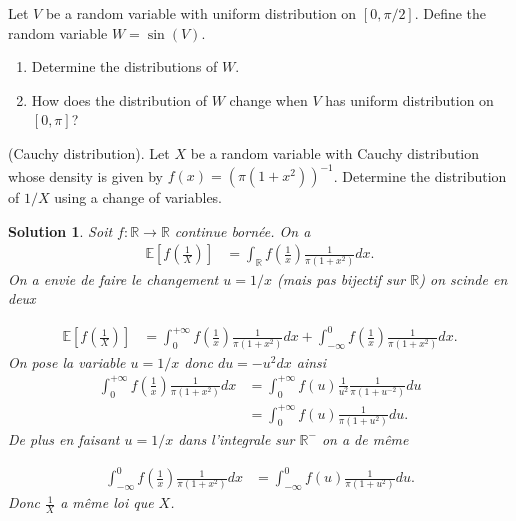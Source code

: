 \documentclass{article}
\newtheorem{solution}{Solution}
\begin{document}
\begin{Exercise} Let $V$ be a random variable with uniform distribution on $[0, \pi / 2]$. Define the random variable $W=\sin (V)$.
  \begin{enumerate}
    \item Determine the distributions of $W$.
    \item How does the distribution of $W$ change when $V$ has uniform distribution on
          $[0, \pi]$?
  \end{enumerate}
\end{Exercise}

\begin{Exercise} (Cauchy distribution). Let $X$ be a random variable with Cauchy distribution whose density is given by $f(x)={\left(\pi\left(1+x^{2}\right)\right)}^{-1}$. Determine the distribution of $1 / X$ using a change of variables.
\end{Exercise}

\begin{solution}
  Soit $f:\mathbb R\longrightarrow \mathbb R$ continue born\'ee. On a
  \begin{align*}
    \mathbb E[f(\frac1X)] & =\int_\mathbb R f(\frac1x) \frac{1}{\pi(1+x^2)} dx.
  \end{align*}
  On a envie de faire le changement $u=1/x$ (mais pas bijectif sur $\mathbb R$) on scinde en deux

  \begin{align*}
    \mathbb E[f(\frac1X)] & =\int_0^{+\infty} f(\frac1x) \frac{1}{\pi(1+x^2)} dx+ \int_{-\infty}^0 f(\frac1x) \frac{1}{\pi(1+x^2)} dx.
  \end{align*}
  On pose la variable $u=1/x$ donc $du=-u^2 dx$ ainsi
  \begin{align*}
    \int_0^{+\infty} f(\frac1x) \frac{1}{\pi(1+x^2)} dx & =\int_0^{+\infty} f(u)\frac{1}{u^2}  \frac{1}{\pi(1+u^{-2})} du \\
                                                        & =\int_0^{+\infty} f(u) \frac{1}{\pi(1+u^2)} du.
  \end{align*}
  De plus en faisant $u=1/x$ dans l'integrale sur $\mathbb R^-$ on a de m\^eme

  \begin{align*}
    \int_{-\infty}^0 f(\frac1x) \frac{1}{\pi(1+x^2)} dx & =\int_{-\infty}^0 f(u) \frac{1}{\pi(1+u^2)} du.
  \end{align*}
  Donc $\frac1X$ a m\^eme loi que $X$.
\end{solution}
\end{document}
